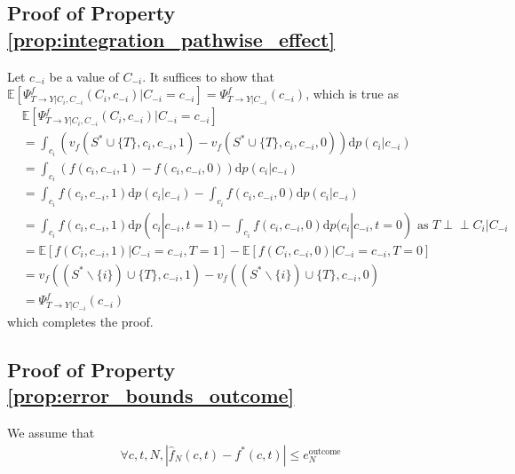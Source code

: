 \documentclass{article}
\theoremstyle{plain}
\theoremstyle{definition}
\theoremstyle{remark}
\newcommand{\effect}{\Psi}
\theoremstyle{mystyle}
\newcommand{\indep}{\perp\!\!\!\!\perp}
\begin{document}
\subsection{Proof of Property \ref{prop:integration_pathwise_effect}}
\label{proof:integration_pathwise_effect}
Let $c_{-i}$ be a value of $C_{-i}$. It suffices to show that $\mathbb{E}[\effect^f_{T \rightarrow Y | C_i, C_{-i}}(C_i,c_{-i}) | C_{-i} = c_{-i}] = \effect^f_{T \rightarrow Y | C_{-i}}(c_{-i})$, which is true as
\begin{align*}
    &\mathbb{E}[\effect^f_{T \rightarrow Y | C_i, C_{-i}}(C_i,c_{-i}) | C_{-i} = c_{-i}] \\
    &= \int_{c_i} (v_f(S^* \cup \{T\}, c_i, c_{-i}, 1) - v_f(S^* \cup \{T\}, c_i, c_{-i}, 0)) \text{d}p(c_i | c_{-i}) \\
    &= \int_{c_i} (f(c_i, c_{-i}, 1) - f(c_i, c_{-i}, 0)) \text{d}p(c_i | c_{-i}) \\
    &= \int_{c_i} f(c_i, c_{-i}, 1)\text{d}p(c_i | c_{-i}) - \int_{c_i}f(c_i, c_{-i}, 0) \text{d}p(c_i | c_{-i}) \\
    &= \int_{c_i} f(c_i, c_{-i}, 1)\text{d}p(c_i | c_{-i}, t=1) - \int_{c_i}f(c_i, c_{-i}, 0) \text{d}p(c_i | c_{-i}, t=0) \text{ as } T \indep C_i | C_{-i} \\
    &= \mathbb{E}[f(C_i, c_{-i}, 1) | C_{-i}=c_{-i}, T=1] - \mathbb{E}[f(C_i, c_{-i}, 0) | C_{-i}=c_{-i}, T=0] \\
    &= v_f((S^* \backslash \{i\}) \cup \{T\}, c_{-i}, 1) - v_f((S^* \backslash \{i\}) \cup \{T\}, c_{-i}, 0) \\
    &= \effect^f_{T \rightarrow Y | C_{-i}}(c_{-i})
\end{align*}
which completes the proof.



\subsection{Proof of Property \ref{prop:error_bounds_outcome}}
\label{proof:error_bounds_outcome}
We assume that
    \begin{align*}
    \forall c, t, N, | \hat{f}_N(c,t) - f^*(c,t) | \leq e^\text{outcome}_N
    \end{align*}
\end{document}
